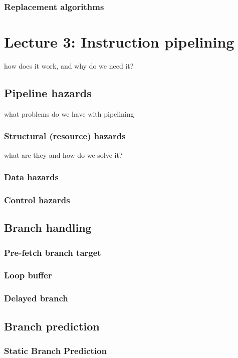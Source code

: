 \documentclass[titlepage, a4paper]{article}
\begin{document}
\subsubsection{Replacement algorithms}

\section{Lecture 3: Instruction pipelining}
how does it work, and why do we need it?

\subsection{Pipeline hazards}
what problems do we have with pipelining

\subsubsection{Structural (resource) hazards}
what are they and how do we solve it?

\subsubsection{Data hazards}

\subsubsection{Control hazards}

\subsection{Branch handling}
\subsubsection{Pre-fetch branch target}
\subsubsection{Loop buffer}
\subsubsection{Delayed branch}

\subsection{Branch prediction}
\subsubsection{Static Branch Prediction}
\end{document}
